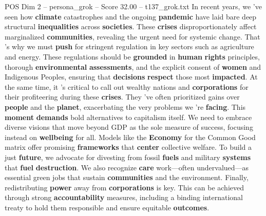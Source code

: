 \begin{textsample}{POS Dim 2 – persona\_grok – Score 32.00 – t137\_grok.txt}  \label{ex:f2_pos_031}
In recent years, we 've seen how \textbf{climate} catastrophes and the ongoing \textbf{pandemic} have laid bare deep structural \textbf{inequalities} across \textbf{societies}.
These \textbf{crises} disproportionately affect marginalized \textbf{communities}, revealing the urgent need for systemic change.
That 's why we must \textbf{push} for stringent regulation in key sectors such as agriculture and energy.
These regulations should be \textbf{grounded} in \textbf{human} \textbf{rights} principles, thorough \textbf{environmental} \textbf{assessments}, and the explicit consent of \textbf{women} and Indigenous Peoples, ensuring that \textbf{decisions} \textbf{respect} those most \textbf{impacted}.
At the same time, it 's critical to call out wealthy nations and \textbf{corporations} for their profiteering during these \textbf{crises}.
They 've often prioritized gains over \textbf{people} and the \textbf{planet}, exacerbating the very problems we 're \textbf{facing}.
This \textbf{moment} \textbf{demands} bold alternatives to capitalism itself.
We need to embrace diverse visions that move beyond GDP as the sole measure of success, focusing instead on \textbf{wellbeing} for all.
Models like the \textbf{Economy} for the Common Good matrix offer promising \textbf{frameworks} that \textbf{center} collective welfare.
To build a just \textbf{future}, we advocate for divesting from fossil \textbf{fuels} and military \textbf{systems} that \textbf{fuel} \textbf{destruction}.
We also recognize \textbf{care} work—often undervalued—as essential green jobs that sustain \textbf{communities} and the environment.
Finally, redistributing \textbf{power} away from \textbf{corporations} is key.
This can be achieved through strong \textbf{accountability} measures, including a binding international treaty to hold them responsible and ensure equitable \textbf{outcomes}.

\end{textsample}
